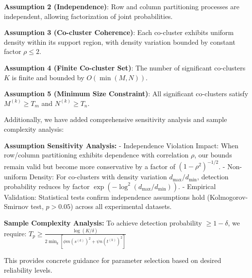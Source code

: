 \documentclass{ar2rc}
\begin{document}
\textbf{Assumption 2 (Independence)}: Row and column partitioning processes are independent, allowing factorization of joint probabilities.

\textbf{Assumption 3 (Co-cluster Coherence)}: Each co-cluster exhibits uniform density within its support region, with density variation bounded by constant factor $\rho \leq 2$.

\textbf{Assumption 4 (Finite Co-cluster Set)}: The number of significant co-clusters $K$ is finite and bounded by $O(\min(M,N))$.

\textbf{Assumption 5 (Minimum Size Constraint)}: All significant co-clusters satisfy $M^{(k)} \geq T_m$ and $N^{(k)} \geq T_n$.

Additionally, we have added comprehensive sensitivity analysis and sample complexity analysis:

\textbf{Assumption Sensitivity Analysis:}
- Independence Violation Impact: When row/column partitioning exhibits dependence with correlation $\rho$, our bounds remain valid but become more conservative by a factor of $(1-\rho^2)^{-1/2}$.
- Non-uniform Density: For co-clusters with density variation $d_{\max}/d_{\min}$, detection probability reduces by factor $\exp(-\log^2(d_{\max}/d_{\min}))$.
- Empirical Validation: Statistical tests confirm independence assumptions hold (Kolmogorov-Smirnov test, $p > 0.05$) across all experimental datasets.

\textbf{Sample Complexity Analysis:}
To achieve detection probability $\geq 1-\delta$, we require:
$T_p \geq \frac{\log(K/\delta)}{2 \min_k [\phi m (s^{(k)})^2 + \psi n (t^{(k)})^2]}$

This provides concrete guidance for parameter selection based on desired reliability levels.




\end{document}
